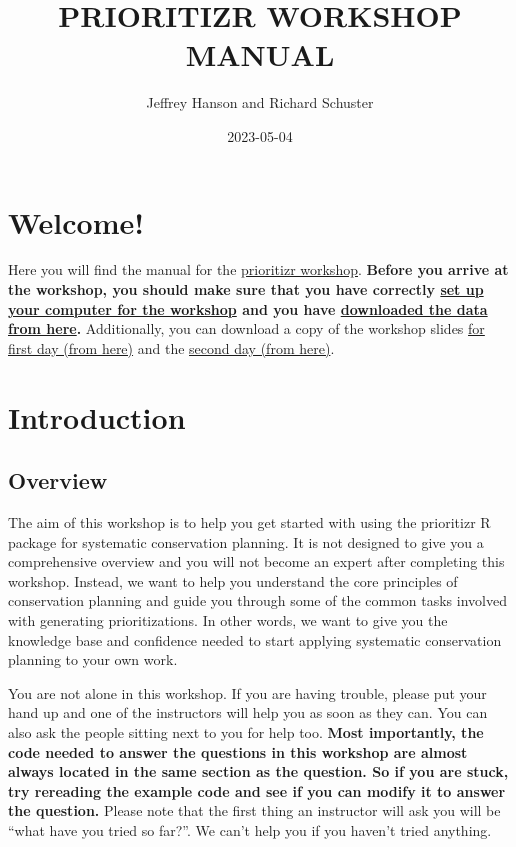 \documentclass[
  12pt,
]{book}
\title{PRIORITIZR WORKSHOP MANUAL}
\author{Jeffrey Hanson and Richard Schuster}
\date{2023-05-04}
\begin{document}
\maketitle

{
\hypersetup{linkcolor=}
\setcounter{tocdepth}{0}
\tableofcontents
}
\hypertarget{welcome}{%
\chapter{Welcome!}\label{welcome}}

Here you will find the manual for the \href{https://prioritizr.github.io/workshop/}{prioritizr workshop}. \textbf{Before you arrive at the workshop, you should make sure that you have correctly \protect\hyperlink{setup}{set up your computer for the workshop} and you have \href{https://github.com/prioritizr/workshop/raw/main/data.zip}{downloaded the data from here}.} Additionally, you can download a copy of the workshop slides \href{https://github.com/prioritizr/workshop/raw/main/slides-day-1.pptx}{for first day (from here)} and the \href{https://github.com/prioritizr/workshop/raw/main/slides-day-2.pptx}{second day (from here)}.

\hypertarget{introduction}{%
\chapter{Introduction}\label{introduction}}

\hypertarget{overview}{%
\section{Overview}\label{overview}}

The aim of this workshop is to help you get started with using the prioritizr R package for systematic conservation planning. It is not designed to give you a comprehensive overview and you will not become an expert after completing this workshop. Instead, we want to help you understand the core principles of conservation planning and guide you through some of the common tasks involved with generating prioritizations. In other words, we want to give you the knowledge base and confidence needed to start applying systematic conservation planning to your own work.

You are not alone in this workshop. If you are having trouble, please put your hand up and one of the instructors will help you as soon as they can. You can also ask the people sitting next to you for help too. \textbf{Most importantly, the code needed to answer the questions in this workshop are almost always located in the same section as the question. So if you are stuck, try rereading the example code and see if you can modify it to answer the question.} Please note that the first thing an instructor will ask you will be ``what have you tried so far?''. We can't help you if you haven't tried anything.
\end{document}
